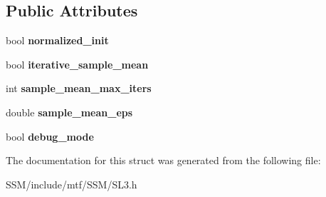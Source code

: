 \subsection*{Public Attributes}
\begin{DoxyCompactItemize}
\item 
\hypertarget{structSL3Params_a6b7c082244211af49513d7214b2bc03b}{bool {\bfseries normalized\-\_\-init}}\label{structSL3Params_a6b7c082244211af49513d7214b2bc03b}

\item 
\hypertarget{structSL3Params_acfa8204fe71f2008bab5f63dbd94e6a9}{bool {\bfseries iterative\-\_\-sample\-\_\-mean}}\label{structSL3Params_acfa8204fe71f2008bab5f63dbd94e6a9}

\item 
\hypertarget{structSL3Params_a1189ec7fe9d48163547abb630338c752}{int {\bfseries sample\-\_\-mean\-\_\-max\-\_\-iters}}\label{structSL3Params_a1189ec7fe9d48163547abb630338c752}

\item 
\hypertarget{structSL3Params_ae625b4fa301b1e1115c7dad4743ea4ad}{double {\bfseries sample\-\_\-mean\-\_\-eps}}\label{structSL3Params_ae625b4fa301b1e1115c7dad4743ea4ad}

\item 
\hypertarget{structSL3Params_a5b6f1fcee202cd82905c9886ebcdf131}{bool {\bfseries debug\-\_\-mode}}\label{structSL3Params_a5b6f1fcee202cd82905c9886ebcdf131}

\end{DoxyCompactItemize}


The documentation for this struct was generated from the following file\-:\begin{DoxyCompactItemize}
\item 
S\-S\-M/include/mtf/\-S\-S\-M/S\-L3.\-h\end{DoxyCompactItemize}
